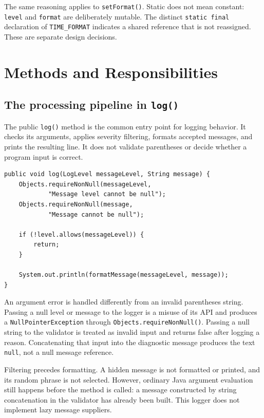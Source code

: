 \documentclass[12pt,a4paper]{article}
\newcommand{\code}[1]{\texttt{#1}}
\begin{document}
The same reasoning applies to \code{setFormat()}. Static does not mean constant: \code{level} and \code{format} are deliberately mutable. The distinct \code{static final} declaration of \code{TIME\_FORMAT} indicates a shared reference that is not reassigned. These are separate design decisions.

\section{Methods and Responsibilities}
\subsection{The processing pipeline in \code{log()}}
The public \code{log()} method is the common entry point for logging behavior. It checks its arguments, applies severity filtering, formats accepted messages, and prints the resulting line. It does not validate parentheses or decide whether a program input is correct.

\begin{samepage}
\begin{lstlisting}
public void log(LogLevel messageLevel, String message) {
    Objects.requireNonNull(messageLevel,
            "Message level cannot be null");
    Objects.requireNonNull(message,
            "Message cannot be null");

    if (!level.allows(messageLevel)) {
        return;
    }

    System.out.println(formatMessage(messageLevel, message));
}
\end{lstlisting}
\end{samepage}

An argument error is handled differently from an invalid parentheses string. Passing a null level or message to the logger is a misuse of its API and produces a \code{NullPointerException} through \code{Objects.requireNonNull()}. Passing a null string to the validator is treated as invalid input and returns false after logging a reason. Concatenating that input into the diagnostic message produces the text \code{null}, not a null message reference.

Filtering precedes formatting. A hidden message is not formatted or printed, and its random phrase is not selected. However, ordinary Java argument evaluation still happens before the method is called: a message constructed by string concatenation in the validator has already been built. This logger does not implement lazy message suppliers.
\end{document}
